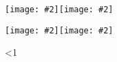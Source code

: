 \documentclass{article}
\newcommand{\fourplay}[2]%
{\pagebreak\texttt{[image: \#2]}\texttt{[image: \#2]}\par
\texttt{[image: \#2]}\texttt{[image: \#2]}\par}
\begin{document}
\loop\fourplay{\thepage}{test5.pdf}
\ifnum\value{page}<1\relax \repeat%
\end{document}
